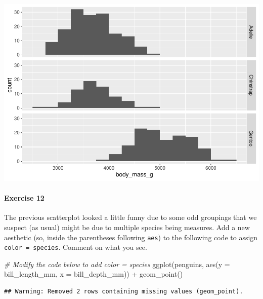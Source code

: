\documentclass[
]{book}
\newenvironment{Shaded}{\begin{snugshade}}{\end{snugshade}}
\newcommand{\AttributeTok}[1]{\textcolor[rgb]{0.77,0.63,0.00}{#1}}
\newcommand{\CommentTok}[1]{\textcolor[rgb]{0.56,0.35,0.01}{\textit{#1}}}
\newcommand{\FunctionTok}[1]{\textcolor[rgb]{0.00,0.00,0.00}{#1}}
\newcommand{\NormalTok}[1]{#1}
\newcommand{\SpecialCharTok}[1]{\textcolor[rgb]{0.00,0.00,0.00}{#1}}
\begin{document}
\includegraphics{intro_stats_files/figure-latex/unnamed-chunk-117-1.pdf}

\hypertarget{exercise-12-1}{%
\paragraph*{Exercise 12}\label{exercise-12-1}}

The previous scatterplot looked a little funny due to some odd groupings that we suspect (as usual) might be due to multiple species being measures. Add a new aesthetic (so, inside the parentheses following \texttt{aes}) to the following code to assign \texttt{color\ =\ species}. Comment on what you see.

\begin{Shaded}
\begin{Highlighting}[]
\CommentTok{\# Modify the code below to add color = species}
\FunctionTok{ggplot}\NormalTok{(penguins, }\FunctionTok{aes}\NormalTok{(}\AttributeTok{y =}\NormalTok{ bill\_length\_mm, }\AttributeTok{x =}\NormalTok{ bill\_depth\_mm)) }\SpecialCharTok{+}
    \FunctionTok{geom\_point}\NormalTok{()}
\end{Highlighting}
\end{Shaded}

\begin{verbatim}
## Warning: Removed 2 rows containing missing values (geom_point).
\end{verbatim}
\end{document}
